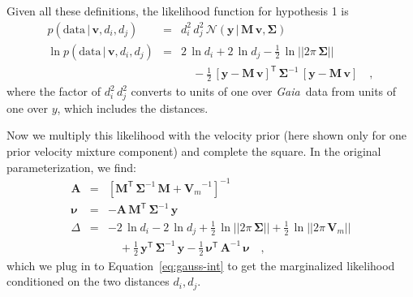 \documentclass[manuscript, letterpaper]{aastex6}
\newcommand{\project}[1]{\textsl{#1}}
\newcommand{\gaia}{\project{Gaia}}
\newcommand{\eqname}{Equation}
\newcommand{\given}{\,|\,}
\newcommand{\normal}{{\mathcal{N}}}
\newcommand{\transp}[1]{{#1}^{\!\mathsf{T}}}
\newcommand{\inv}[1]{{#1}^{-1}}
\newcommand{\bs}[1]{\boldsymbol{#1}}
\newcommand{\mat}[1]{\mathbf{#1}}
\renewcommand{\vec}[1]{\bs{#1}}
\newcommand{\data}{\mathrm{data}}
\begin{document}
Given all these definitions, the likelihood function for hypothesis 1 is
\begin{eqnarray}
  p(\data \given \vec{v}, d_i, d_j) &=& d_i^2\,d_j^2\,
    \normal(\vec{y} \given \mat{M}\,\vec{v}, \mat{\Sigma}) \\
  \ln p(\data \given \vec{v}, d_i, d_j) &=& 2\,\ln d_i + 2\,\ln d_j
    -\frac{1}{2}\,\ln||2\pi\,\mat{\Sigma}|| \nonumber \\
    && \quad -\frac{1}{2}\,\transp{[\vec{y}-\mat{M}\,\vec{v}]}\,
      \inv{\mat{\Sigma}}\,
      [\vec{y}-\mat{M}\,\vec{v}]
  \quad ,
\end{eqnarray}
where the factor of $d_i^2\,d_j^2$ converts to units of one over \gaia\ data
from units of one over $y$, which includes the distances.

Now we multiply this likelihood with the velocity prior (here shown only for one
prior velocity mixture component) and complete the square.
In the original parameterization, we find:
\begin{eqnarray}
  \mat{A} &=& \inv{[\transp{\mat{M}}\,\inv{\mat{\Sigma}}\,\mat{M}+\inv{\mat{V}_m}]}
  \\
  \vec{\nu} &=& -\mat{A}\,\transp{\mat{M}}\,\inv{\mat{\Sigma}}\,\vec{y}
  \\
  \Delta &=& -2\,\ln d_i -2\,\ln d_j
    +\frac{1}{2}\,\ln||2\pi\,\mat{\Sigma}|| +\frac{1}{2}\,\ln||2\pi\,\mat{V}_m|| \nonumber \\
    && \quad +\frac{1}{2}\,\transp{\vec{y}}\,\inv{\mat{\Sigma}}\,\vec{y} -\frac{1}{2}\,\transp{\vec{\nu}}\,\inv{\mat{A}}\,\vec{\nu}
  \quad ,
\end{eqnarray}
which we plug in to \eqname~\ref{eq:gauss-int} to get the marginalized
likelihood conditioned on the two distances $d_i, d_j$.
\end{document}
